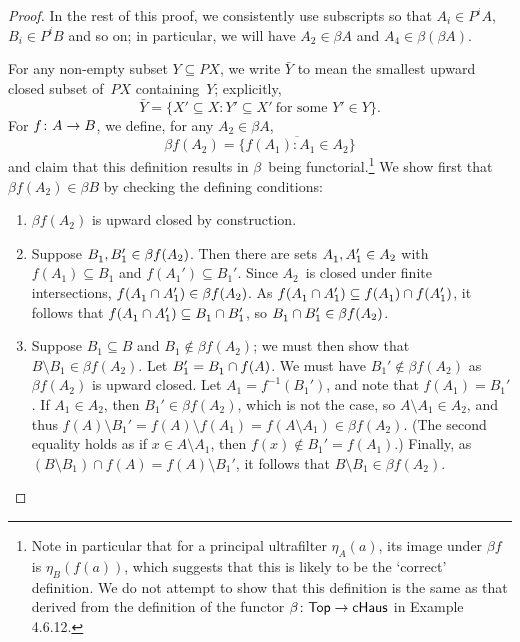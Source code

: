 \documentclass[../../solutions]{subfiles}
\begin{document}
\begin{proof}
  In the rest of this proof, we consistently use subscripts so that
  $A_i\in P^iA$, $B_i\in P^iB$ and so on; in particular, we will have
  $A_2\in\beta A$ and $A_4\in\beta(\beta A)$.

  For any non-empty subset $Y\subseteq PX$, we write $\bar Y$ to mean
  the smallest upward closed subset of~$PX$ containing~$Y$;
  explicitly,
  $$\bar Y=\{X'\subseteq X: Y'\subseteq X'\ \text{for some $Y'\in
    Y$}\}.$$
  For ${f}\colon{A}\to{B}$, we define, for any $A_2\in\beta A$,
  $$\beta f(A_2)=\overline{\{f(A_1)\colon A_1\in A_2\}}$$
  and claim that this definition results in $\beta$~being
  functorial.\footnote{Note in particular that for a principal
    ultrafilter $\eta_A(a)$, its image under $\beta f$ is
    $\eta_B(f(a))$, which suggests that this is likely to be the
    `correct' definition.  We do not attempt to show that this
    definition is the same as that derived from the definition of the
    functor ${\beta}\colon{\ensuremath{\mathsf{Top}}}\to{\ensuremath{\mathsf{cHaus}}}$ in Example 4.6.12.}  We
  show first that $\beta f(A_2)\in \beta B$ by checking the defining
  conditions:
  \begin{enumerate}[label=(\arabic*)]
  \item $\beta f(A_2)$ is upward closed by construction.
  \item Suppose $B_1^{\vphantom1}, B_1'\in \beta f(A_2)$.  Then there
    are sets $A_1^{\vphantom1},A_1'\in A_2$ with $f(A_1)\subseteq B_1$
    and $f(A_1')\subseteq B_1'$.  Since $A_2$~is closed under finite
    intersections, $f(A_1^{\vphantom1}\cap A_1')\in \beta f(A_2)$.  As
    $f(A_1^{\vphantom1}\cap A_1')\subseteq f(A_1^{\vphantom1})\cap
    f(A_1')$, it follows that
    $f(A_1^{\vphantom1}\cap A_1')\subseteq B_1^{\vphantom1}\cap B_1'$,
    so $B_1^{\vphantom1}\cap B_1'\in \beta f(A_2)$.
  \item Suppose $B_1\subseteq B$ and $B_1\notin \beta f(A_2)$; we must
    then show that $B\setminus B_1\in \beta f(A_2)$.  Let
    $B_1'=B_1^{\vphantom1}\cap f(A)$.  We must have
    $B_1'\notin\beta f(A_2)$ as $\beta f(A_2)$ is upward closed.  Let
    $A_1=f^{-1}(B_1')$, and note that $f(A_1)=B_1'$.  If $A_1\in A_2$,
    then $B_1'\in \beta f(A_2)$, which is not the case, so
    $A\setminus A_1\in A_2$, and thus
    $f(A)\setminus B_1'=f(A)\setminus f(A_1)=f(A\setminus A_1)\in
    \beta f(A_2)$.  (The second equality holds as if $x\in A\setminus
    A_1$, then $f(x)\notin B_1'=f(A_1)$.)  Finally, as $(B\setminus
    B_1)\cap f(A)= f(A)\setminus B_1'$, it follows that $B\setminus
    B_1\in \beta f(A_2)$.


\end{enumerate}
\end{proof}
\end{document}
